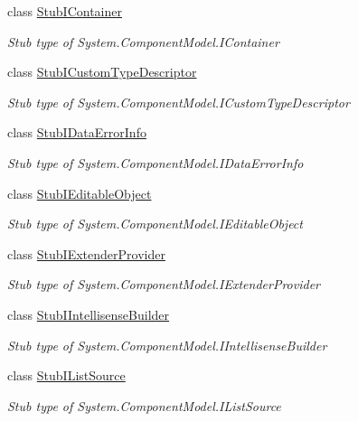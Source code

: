 \begin{DoxyCompactItemize}
class \hyperlink{class_system_1_1_component_model_1_1_fakes_1_1_stub_i_container}{Stub\-I\-Container}
\begin{DoxyCompactList}\small\item\em Stub type of System.\-Component\-Model.\-I\-Container\end{DoxyCompactList}\item 
class \hyperlink{class_system_1_1_component_model_1_1_fakes_1_1_stub_i_custom_type_descriptor}{Stub\-I\-Custom\-Type\-Descriptor}
\begin{DoxyCompactList}\small\item\em Stub type of System.\-Component\-Model.\-I\-Custom\-Type\-Descriptor\end{DoxyCompactList}\item 
class \hyperlink{class_system_1_1_component_model_1_1_fakes_1_1_stub_i_data_error_info}{Stub\-I\-Data\-Error\-Info}
\begin{DoxyCompactList}\small\item\em Stub type of System.\-Component\-Model.\-I\-Data\-Error\-Info\end{DoxyCompactList}\item 
class \hyperlink{class_system_1_1_component_model_1_1_fakes_1_1_stub_i_editable_object}{Stub\-I\-Editable\-Object}
\begin{DoxyCompactList}\small\item\em Stub type of System.\-Component\-Model.\-I\-Editable\-Object\end{DoxyCompactList}\item 
class \hyperlink{class_system_1_1_component_model_1_1_fakes_1_1_stub_i_extender_provider}{Stub\-I\-Extender\-Provider}
\begin{DoxyCompactList}\small\item\em Stub type of System.\-Component\-Model.\-I\-Extender\-Provider\end{DoxyCompactList}\item 
class \hyperlink{class_system_1_1_component_model_1_1_fakes_1_1_stub_i_intellisense_builder}{Stub\-I\-Intellisense\-Builder}
\begin{DoxyCompactList}\small\item\em Stub type of System.\-Component\-Model.\-I\-Intellisense\-Builder\end{DoxyCompactList}\item 
class \hyperlink{class_system_1_1_component_model_1_1_fakes_1_1_stub_i_list_source}{Stub\-I\-List\-Source}
\begin{DoxyCompactList}\small\item\em Stub type of System.\-Component\-Model.\-I\-List\-Source\end{DoxyCompactList}\item 

\end{DoxyCompactItemize}
